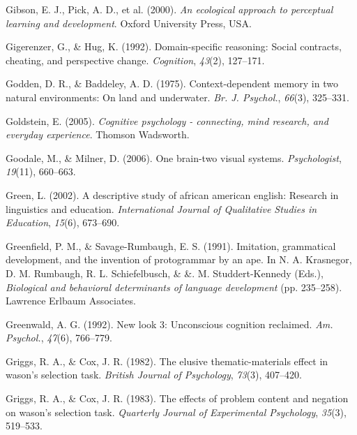 \documentclass[
]{krantz}
\newlength{\cslhangindent}
\newlength{\cslentryspacingunit} %
\newenvironment{CSLReferences}[2] %
 {%
  \setlength{\parindent}{0pt}
  \ifodd #1
  \let\oldpar\par
  \def\par{\hangindent=\cslhangindent\oldpar}
  \fi
  \setlength{\parskip}{#2\cslentryspacingunit}
 }%
 {}
\begin{document}
\begin{CSLReferences}{1}{0}
\leavevmode{}%
Gibson, E. J., Pick, A. D., et al. (2000). \emph{An ecological approach to perceptual learning and development}. Oxford University Press, USA.

\leavevmode{}%
Gigerenzer, G., \& Hug, K. (1992). Domain-specific reasoning: Social contracts, cheating, and perspective change. \emph{Cognition}, \emph{43}(2), 127--171.

\leavevmode{}%
Godden, D. R., \& Baddeley, A. D. (1975). Context-dependent memory in two natural environments: On land and underwater. \emph{Br. J. Psychol.}, \emph{66}(3), 325--331.

\leavevmode{}%
Goldstein, E. (2005). \emph{Cognitive psychology - connecting, mind research, and everyday experience}. Thomson Wadsworth.

\leavevmode{}%
Goodale, M., \& Milner, D. (2006). One brain-two visual systems. \emph{Psychologist}, \emph{19}(11), 660--663.

\leavevmode{}%
Green, L. (2002). A descriptive study of african american english: Research in linguistics and education. \emph{International Journal of Qualitative Studies in Education}, \emph{15}(6), 673--690.

\leavevmode{}%
Greenfield, P. M., \& Savage-Rumbaugh, E. S. (1991). Imitation, grammatical development, and the invention of protogrammar by an ape. In N. A. Krasnegor, D. M. Rumbaugh, R. L. Schiefelbusch, \& \&. M. Studdert-Kennedy (Eds.), \emph{Biological and behavioral determinants of language development} (pp. 235--258). Lawrence Erlbaum Associates.

\leavevmode{}%
Greenwald, A. G. (1992). New look 3: Unconscious cognition reclaimed. \emph{Am. Psychol.}, \emph{47}(6), 766--779.

\leavevmode{}%
Griggs, R. A., \& Cox, J. R. (1982). The elusive thematic-materials effect in wason's selection task. \emph{British Journal of Psychology}, \emph{73}(3), 407--420.

\leavevmode{}%
Griggs, R. A., \& Cox, J. R. (1983). The effects of problem content and negation on wason's selection task. \emph{Quarterly Journal of Experimental Psychology}, \emph{35}(3), 519--533.


\end{CSLReferences}
\end{document}
